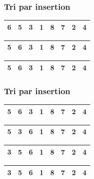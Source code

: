 \begin{frame}
\frametitle{Tri par insertion}
\begin{table}
\begin{tabular}{| c | c | c | c | c | c | c | c |}
\hline
\cellcolor{blue!25}6 & \cellcolor{red!25}5 & 3 & 1 & 8 & 7 & 2 & 4 \\ 
\hline
\end{tabular}
\end{table}
\begin{table}
\begin{tabular}{| c | c | c | c | c | c | c | c |}
\hline
\cellcolor{red!25}5 & \cellcolor{blue!25}6 & 3 & 1 & 8 & 7 & 2 & 4 \\ 
\hline
\end{tabular}
\end{table}
\begin{table}
\begin{tabular}{| c | c | c | c | c | c | c | c |}
\hline
\cellcolor{blue!25}5 & \cellcolor{blue!25}6 & 3 & 1 & 8 & 7 & 2 & 4 \\ 
\hline
\end{tabular}
\end{table}
\end{frame}

\begin{frame}
\frametitle{Tri par insertion}
\begin{table}
\begin{tabular}{| c | c | c | c | c | c | c | c |}
\hline
\cellcolor{blue!25}5 & \cellcolor{blue!25}6 & \cellcolor{red!25}3 & 1 & 8 & 7 & 2 & 4 \\ 
\hline
\end{tabular}
\end{table}
\begin{table}
\begin{tabular}{| c | c | c | c | c | c | c | c |}
\hline
\cellcolor{blue!25}5 & \cellcolor{red!25}3 & \cellcolor{blue!25}6 & 1 & 8 & 7 & 2 & 4 \\ 
\hline
\end{tabular}
\end{table}
\begin{table}
\begin{tabular}{| c | c | c | c | c | c | c | c |}
\hline
\cellcolor{red!25}3 & \cellcolor{blue!25}5 & \cellcolor{blue!25}6 & 1 & 8 & 7 & 2 & 4 \\ 
\hline
\end{tabular}
\end{table}
\begin{table}
\begin{tabular}{| c | c | c | c | c | c | c | c |}
\hline
\cellcolor{blue!25}3 & \cellcolor{blue!25}5 & \cellcolor{blue!25}6 & 1 & 8 & 7 & 2 & 4 \\ 
\hline
\end{tabular}
\end{table}
\end{frame}


